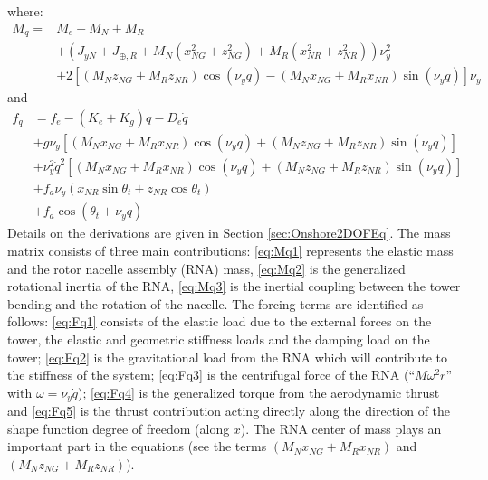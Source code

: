 \documentclass[wes, manuscript]{copernicus}
\begin{document}
where:
\begin{align}
M_q = & M_{e} +  M_N + M_R \label{eq:Mq1}\\
     &+ (J_{y N} + J_{\oplus,R} + M_N(x_{NG}^{2} + z_{NG}^{2}) + M_R(x_{NR}^{2} + z_{NR}^{2}) ) \nu_y^{2}  \label{eq:Mq2}\\
     &+2  \left[   (M_N z_{NG} + M_R z_{NR}) \cos{\left(\nu_y q \right)} -(M_N x_{NG} + M_{R} x_{NR})\sin{\left(\nu_y q \right)} \right] \nu_y\label{eq:Mq3}
\end{align}
and
\begin{align}
 f_q &= f_{e} - (K_{e}+K_g) q  - D_{e} \dot{q} \label{eq:Fq1} \\
 &+ g \nu_y \left [ (M_N x_{NG}+M_R x_{NR}) \cos{\left(\nu_y q \right)}
 +                  (M_N z_{NG}+M_R z_{NR}) \sin{\left(\nu_y q \right)} \right]  \label{eq:Fq2}\\
 &+ \nu_y^2 \dot{q}^2\left[
  ( M_N x_{NG} + M_R x_{NR}) \cos{\left(\nu_y q \right)} 
 +( M_N z_{NG} + M_R z_{NR}) \sin{\left(\nu_y q \right)}
 \right]  \label{eq:Fq3} \\
 &+f_a \nu_y ( x_{NR} \sin\theta_t + z_{NR} \cos\theta_t)  \label{eq:Fq4} \\
 &+ f_a \cos{\left(\theta_t + \nu_y q \right)}\label{eq:Fq5} 
\end{align}
Details on the derivations are given in Section \ref{sec:Onshore2DOFEq}.
The mass matrix consists of three main contributions:
\autoref{eq:Mq1} represents the elastic mass and the rotor nacelle assembly (RNA) mass,
\autoref{eq:Mq2} is the generalized rotational inertia of the RNA, 
\autoref{eq:Mq3} is the inertial coupling between the tower bending and the rotation of the nacelle.
The forcing terms are identified as follows:
\autoref{eq:Fq1} consists of the elastic load due to the external forces on the tower, the elastic and geometric stiffness loads and the damping load on the tower; 
\autoref{eq:Fq2} is the gravitational load from the RNA which will contribute to the stiffness of the system; 
\autoref{eq:Fq3} is the centrifugal force of the RNA (``$M \omega^2 r$'' with $\omega=\nu_y \dot{q}$);
\autoref{eq:Fq4} is the generalized torque from the aerodynamic thrust and  
\autoref{eq:Fq5} is the thrust contribution acting directly along the direction of the shape function degree of freedom (along $x$).
The RNA center of mass plays an important part in the equations (see the terms $(M_N x_{NG}+M_R x_{NR})$ and $(M_N z_{NG}+M_R z_{NR})$). 
\end{document}
